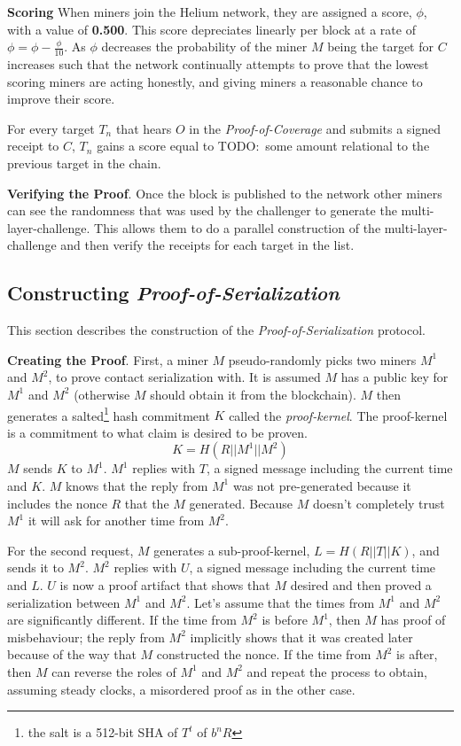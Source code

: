 \documentclass[letterpaper,11pt]{article}
\newcommand{\todo}[1]{}
\renewcommand{\todo}[1]{{\color{red} TODO:\ {#1}}}
\begin{document}
\textbf{Scoring}\label{scores} When miners join the Helium network, they are assigned a score, $\phi$, with a value of \textbf{0.500}. This score depreciates linearly per block at a rate of $\phi = \phi - \frac{\phi}{10}$. As $\phi$ decreases the probability of the miner $M$ being the target for $C$ increases such that the network continually attempts to prove that the lowest scoring miners are acting honestly, and giving miners a reasonable chance to improve their score.

For every target $T_n$ that hears $O$ in the \emph{Proof-of-Coverage} and submits a signed receipt to $C$, $T_n$ gains a score equal to \todo{some amount relational to the previous target in the chain}.

\textbf{Verifying the Proof}. Once the block is published to the network other miners can see the randomness that was used by the challenger to generate the multi-layer-challenge. This allows them to do a parallel construction of the multi-layer-challenge and then verify the receipts for each target in the list.

\subsection{Constructing \emph{Proof-of-Serialization}}

This section describes the construction of the \emph{Proof-of-Serialization} protocol.

\textbf{Creating the Proof}. First, a miner $M$ pseudo-randomly picks two miners $M^1$ and $M^2$, to prove contact serialization with. It is assumed $M$ has a public key for $M^1$ and $M^2$ (otherwise $M$ should obtain it from the blockchain). $M$ then generates a salted\footnote{the salt is a 512-bit SHA of $T^t$ of $b^n R$} hash commitment $K$ called the \emph{proof-kernel}. The proof-kernel is a commitment to what claim is desired to be proven. \[\mathit{K = H\left(R || M^1 || M^2\right)}\] $M$ sends $K$ to $M^1$. $M^1$ replies with $T$, a signed message including the current time and $K$. $M$ knows that the reply from $M^1$ was not pre-generated because it includes the nonce $R$ that the $M$ generated. Because $M$ doesn't completely trust $M^1$ it will ask for another time from $M^2$.

For the second request, $M$ generates a sub-proof-kernel, $L = H\left(R || T || K\right)$, and sends it to $M^2$. $M^2$ replies with $U$, a signed message including the current time and $L$. $U$ is now a proof artifact that shows that $M$ desired and then proved a serialization between $M^1$ and $M^2$. Let's assume that the times from $M^1$ and $M^2$ are significantly different. If the time from $M^2$ is before $M^1$, then $M$ has proof of misbehaviour; the reply from $M^2$ implicitly shows that it was created later because of the way that $M$ constructed the nonce. If the time from $M^2$ is after, then $M$ can reverse the roles of $M^1$ and $M^2$ and repeat the process to obtain, assuming steady clocks, a misordered proof as in the other case.
\end{document}
